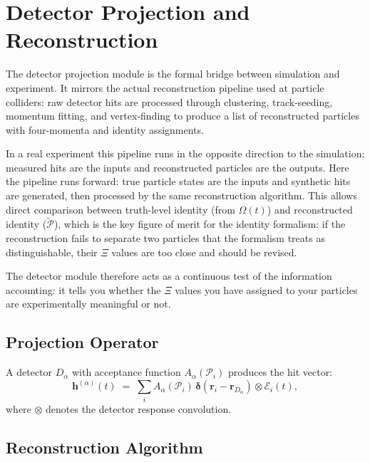 \documentclass[11pt,a4paper]{article}
\newcommand{\Pid}{\mathscr{P}}
\newcommand{\Rec}{\Xi}
\newcommand{\rvec}{\mathbf{r}}
\begin{document}
\section{Detector Projection and Reconstruction}\label{sec:detector}

The detector projection module is the formal bridge between simulation and
experiment.  It mirrors the actual reconstruction pipeline used at particle
colliders: raw detector hits are processed through clustering, track-seeding,
momentum fitting, and vertex-finding to produce a list of reconstructed
particles with four-momenta and identity assignments.

In a real experiment this pipeline runs in the opposite direction to the
simulation: measured hits are the inputs and reconstructed particles are the
outputs.  Here the pipeline runs forward: true particle states are the inputs
and synthetic hits are generated, then processed by the same reconstruction
algorithm.  This allows direct comparison between truth-level identity
(from $\Omega(t)$) and reconstructed identity ($\tilde{\Pid}$), which is the
key figure of merit for the identity formalism: if the reconstruction fails
to separate two particles that the formalism treats as distinguishable, their
$\Rec$ values are too close and should be revised.

The detector module therefore acts as a continuous test of the information
accounting: it tells you whether the $\Rec$ values you have assigned to your
particles are experimentally meaningful or not.

\subsection{Projection Operator}

A detector $D_\alpha$ with acceptance function $A_\alpha(\Pid_i)$ produces
the hit vector:
\[
  \mathbf{h}^{(\alpha)}(t) \;=\;
  \sum_i A_\alpha(\Pid_i) \,
  \boldsymbol{\delta}\!\left(\rvec_i - \rvec_{D_\alpha}\right)
  \otimes \mathcal{E}_i(t) ,
\]
where $\otimes$ denotes the detector response convolution.

\subsection{Reconstruction Algorithm}
\end{document}
